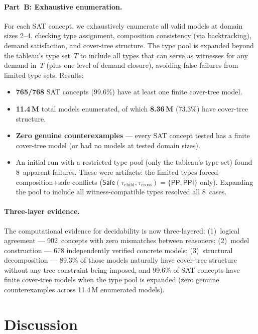 \documentclass[a4paper,11pt]{article}
\theoremstyle{definition}
\newcommand{\PP}{\ensuremath{\mathsf{PP}}}
\newcommand{\PPI}{\ensuremath{\mathsf{PPI}}}
\newcommand{\Safe}{\ensuremath{\mathsf{Safe}}}
\begin{document}
\paragraph{Part~B: Exhaustive enumeration.}
For each SAT concept, we exhaustively enumerate all valid models
at domain sizes 2--4, checking type assignment, composition
consistency (via backtracking), demand satisfaction, and cover-tree
structure.  The type pool is expanded beyond the tableau's type set~$T$
to include all types that can serve as witnesses for any demand in~$T$
(plus one level of demand closure), avoiding false failures from
limited type sets.  Results:
\begin{itemize}[nosep]
  \item \textbf{765/768} SAT concepts (99.6\%) have at least one
    finite cover-tree model.
  \item \textbf{11.4\,M} total models enumerated, of which
    \textbf{8.36\,M} (73.3\%) have cover-tree structure.
  \item \textbf{Zero genuine counterexamples} --- every SAT concept
    tested has a finite cover-tree model (or had no models at
    tested domain sizes).
  \item An initial run with a restricted type pool (only the
    tableau's type set) found 8~apparent failures.  These were
    artifacts: the limited types forced composition$+$safe conflicts
    ($\Safe(\tau_{\text{child}}, \tau_{\text{cross}}) = \{\PP,\PPI\}$
    only).  Expanding the pool to include all witness-compatible types
    resolved all 8~cases.
\end{itemize}

\paragraph{Three-layer evidence.}
The computational evidence for decidability is now three-layered:
(1)~logical agreement --- 902~concepts with zero mismatches between
reasoners; (2)~model construction --- 678 independently verified
concrete models; (3)~structural decomposition --- 89.3\% of those
models naturally have cover-tree structure without any tree
constraint being imposed, and 99.6\% of SAT concepts have finite
cover-tree models when the type pool is expanded (zero genuine
counterexamples across 11.4\,M enumerated models).


\section{Discussion}
\label{sec:discussion}
\end{document}
